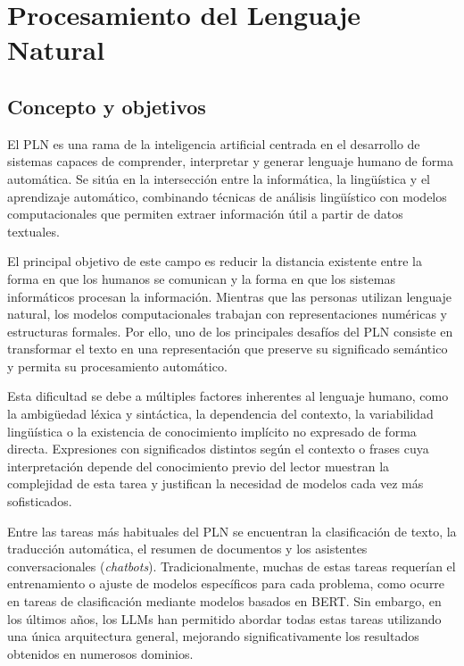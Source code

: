 \section{Procesamiento del Lenguaje Natural}

\subsection{Concepto y objetivos}

El \ac{PLN} es una rama de la inteligencia artificial centrada en el desarrollo de sistemas capaces de comprender, interpretar y generar lenguaje humano de forma automática. Se sitúa en la intersección entre la informática, la lingüística y el aprendizaje automático, combinando técnicas de análisis lingüístico con modelos computacionales que permiten extraer información útil a partir de datos textuales.

El principal objetivo de este campo es reducir la distancia existente entre la forma en que los humanos se comunican y la forma en que los sistemas informáticos procesan la información. Mientras que las personas utilizan lenguaje natural, los modelos computacionales trabajan con representaciones numéricas y estructuras formales. Por ello, uno de los principales desafíos del \ac{PLN} consiste en transformar el texto en una representación que preserve su significado semántico y permita su procesamiento automático.

Esta dificultad se debe a múltiples factores inherentes al lenguaje humano, como la ambigüedad léxica y sintáctica, la dependencia del contexto, la variabilidad lingüística o la existencia de conocimiento implícito no expresado de forma directa. Expresiones con significados distintos según el contexto o frases cuya interpretación depende del conocimiento previo del lector muestran la complejidad de esta tarea y justifican la necesidad de modelos cada vez más sofisticados.

Entre las tareas más habituales del \ac{PLN} se encuentran la clasificación de texto, la traducción automática, el resumen de documentos y los asistentes conversacionales (\textit{chatbots}). Tradicionalmente, muchas de estas tareas requerían el entrenamiento o ajuste de modelos específicos para cada problema, como ocurre en tareas de clasificación mediante modelos basados en \acs{BERT}. Sin embargo, en los últimos años, los \acp{LLM} han permitido abordar todas estas tareas utilizando una única arquitectura general, mejorando significativamente los resultados obtenidos en numerosos dominios.


